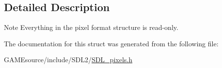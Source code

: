 \subsection{Detailed Description}
\begin{DoxyNote}{Note}
Everything in the pixel format structure is read-\/only. 
\end{DoxyNote}


The documentation for this struct was generated from the following file\+:\begin{DoxyCompactItemize}
\item 
G\+A\+M\+Esource/include/\+S\+D\+L2/\mbox{\hyperlink{_s_d_l__pixels_8h}{S\+D\+L\+\_\+pixels.\+h}}\end{DoxyCompactItemize}

